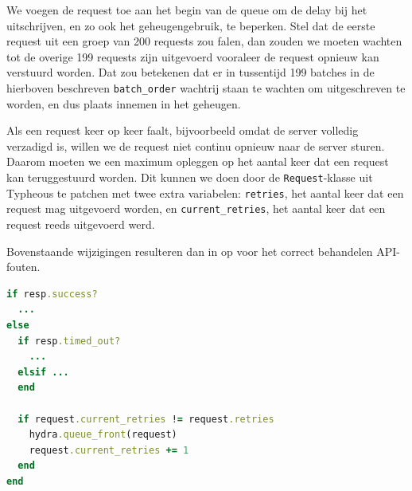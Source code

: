 We voegen de request toe aan het begin van de queue om de delay bij het 
uitschrijven, en zo ook het geheugengebruik, te beperken. Stel dat de eerste 
request uit een groep van 200 requests zou falen, dan zouden we moeten wachten 
tot de overige 199 requests zijn uitgevoerd vooraleer de request opnieuw kan 
verstuurd worden. Dat zou betekenen dat er in tussentijd 199 batches in de 
hierboven beschreven \texttt{batch\_order} wachtrij staan te wachten om 
uitgeschreven te worden, en dus plaats innemen in het geheugen.

Als een request keer op keer faalt, bijvoorbeeld omdat de server volledig 
verzadigd is, willen we de request niet continu opnieuw naar de 
server sturen. Daarom moeten we een maximum opleggen op het aantal keer dat een 
request kan teruggestuurd worden. Dit kunnen we doen door de 
\texttt{Request}-klasse uit Typheous te patchen met twee extra variabelen: 
\texttt{retries}, het aantal keer dat een request mag uitgevoerd worden, 
en \texttt{current\_retries}, het aantal keer dat een request reeds uitgevoerd 
werd.

Bovenstaande wijzigingen resulteren dan in  op 
 voor het correct behandelen API-fouten.

\begin{lstlisting}[caption={Aangepaste code voor het correct behandelen van 
API-fouten.}, label={lst:hydrafix}, language=Ruby]
if resp.success?
  ...
else
  if resp.timed_out?
    ...
  elsif ...
  end
  
  if request.current_retries != request.retries
    hydra.queue_front(request)
    request.current_retries += 1
  end
end
\end{lstlisting}